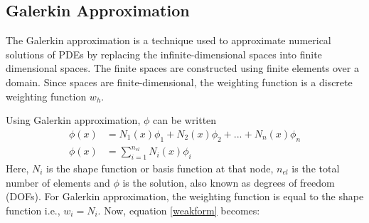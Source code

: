 \documentclass[12pt, oneside]{article}
\begin{document}
\subsection{Galerkin Approximation}
The Galerkin approximation is a technique used to approximate numerical solutions of PDEs by replacing the infinite-dimensional spaces into finite dimensional spaces. The finite spaces are constructed using finite elements over a domain. Since spaces are finite-dimensional, the weighting function is a discrete weighting function $w_h$.

Using Galerkin approximation, $\phi$ can be written
\begin{equation}
    \begin{aligned}
	\phi(x) &= N_1(x)\phi_1 + N_2(x)\phi_2 + ... + N_n(x)\phi_n\\
	\phi \left(x\right) &= \sum_{i=1}^{n_{el}} N_i \left(x\right) \phi_i	
    \end{aligned}
\end{equation}
Here, $N_i$ is the shape function or basis function at that node, $n_{el}$ is the total number of elements and $\phi$ is the solution, also known as degrees of freedom (DOFs). For Galerkin approximation, the weighting function is equal to the shape function i.e., $w_i = N_i$. Now, equation \ref{weakform} becomes:
\begin{equation}
    
\end{equation}
\end{document}
